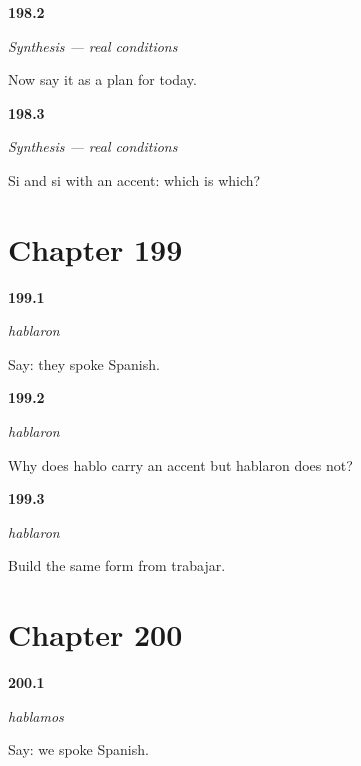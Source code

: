 \noindent\begin{minipage}[t]{\linewidth}
\raggedright
\hypertarget{review-ES-C55-sintesis-condicion-plan}{\textbf{198.2}} \emph{Synthesis — real conditions}\par
\small Now say it as a plan for today.
\end{minipage}\par\medskip

\noindent\begin{minipage}[t]{\linewidth}
\raggedright
\hypertarget{review-ES-C55-sintesis-condicion-two}{\textbf{198.3}} \emph{Synthesis — real conditions}\par
\small Si and si with an accent: which is which?
\end{minipage}\par\medskip

\section*{Chapter 199}

\noindent\begin{minipage}[t]{\linewidth}
\raggedright
\hypertarget{review-ES-C55-hablaron-say}{\textbf{199.1}} \emph{hablaron}\par
\small Say: they spoke Spanish.
\end{minipage}\par\medskip

\noindent\begin{minipage}[t]{\linewidth}
\raggedright
\hypertarget{review-ES-C55-hablaron-accent}{\textbf{199.2}} \emph{hablaron}\par
\small Why does hablo carry an accent but hablaron does not?
\end{minipage}\par\medskip

\noindent\begin{minipage}[t]{\linewidth}
\raggedright
\hypertarget{review-ES-C55-hablaron-build}{\textbf{199.3}} \emph{hablaron}\par
\small Build the same form from trabajar.
\end{minipage}\par\medskip

\section*{Chapter 200}

\noindent\begin{minipage}[t]{\linewidth}
\raggedright
\hypertarget{review-ES-C55-hablamos-dos-say}{\textbf{200.1}} \emph{hablamos}\par
\small Say: we spoke Spanish.
\end{minipage}\par\medskip

